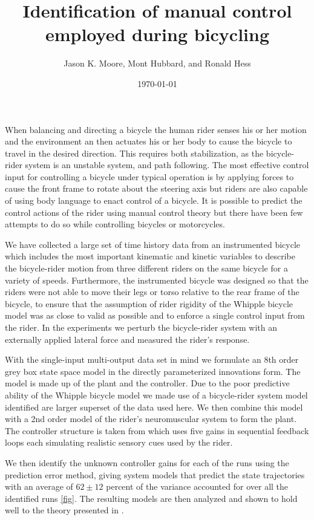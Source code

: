 \documentclass{article}
\title{Identification of manual control employed during bicycling}
\author{Jason K. Moore, Mont Hubbard, and Ronald Hess}
\date{\today}
\begin{document}
\maketitle

When balancing and directing a bicycle the human rider senses his or her motion
and the environment an then actuates his or her body to cause the bicycle to
travel in the desired direction. This requires both  stabilization, as the
bicycle-rider system is an unstable system, and path following. The most
effective control input for controlling a bicycle under typical operation is by
applying forces to cause the front frame to rotate about the steering axis but
riders are also capable of using body language to enact control of a bicycle.
It is possible to predict the control actions of the rider using manual control
theory but there have been few attempts to do so while controlling bicycles or
motorcycles.

We have collected a large set of time history data from an instrumented bicycle
which includes the most important kinematic and kinetic variables to describe
the bicycle-rider motion from three different riders on the same bicycle for a
variety of speeds. Furthermore, the instrumented bicycle was designed so that
the riders were not able to move their legs or torso relative to the rear frame
of the bicycle, to ensure that the assumption of rider rigidity of the Whipple
bicycle model was as close to valid as possible and to enforce a single control
input from the rider. In the experiments we perturb the bicycle-rider system
with an externally applied lateral force and measured the rider's response.

With the single-input multi-output data set in mind we formulate an 8th order
grey box state space model in the directly parameterized innovations form. The
model is made up of the plant and the controller. Due to the poor predictive
ability of the Whipple bicycle model we made use of a bicycle-rider system
model identified are larger superset of the data used here. We then combine
this model with a 2nd order model of the rider's neuromuscular system to form
the plant. The controller structure is taken from \cite{Hess2012} which uses
five gains in sequential feedback loops each simulating realistic sensory cues
used by the rider.

We then identify the unknown controller gains for each of the runs using the
prediction error method, giving system models that predict the state
trajectories with an average of $62 \pm 12$ percent of the variance accounted
for over all the identified runs \ref{fig}. The resulting models are then
analyzed and shown to hold well to the theory presented in \cite{Hess2012}.
\end{document}
